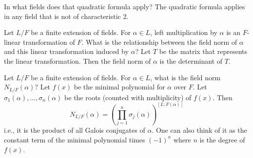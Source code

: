 \documentclass[avery5371,grid]{flashcards}
\begin{document}
% 
% 




 







\begin{flashcard}[Fields]{In what fields does that quadratic formula apply?}
 The quadratic formula applies in any field that is not of characteristic 2.
\end{flashcard}

\begin{flashcard}[Fields]{Let $L/F$ be a finite extension of fields. For $\alpha \in L$, left multiplication by $\alpha$ is an $F$-linear transformation of $F$. What is the relationship between the field norm of $\alpha$ and this linear transformation induced by $\alpha$?}
 Let $T$ be the matrix that represents the linear transformation. Then the field norm of $\alpha$ is the determinant of $T$.
\end{flashcard}

\begin{flashcard}[Fields]{Let $L/F$ be a finite extension of fields. For $\alpha \in L$, what is the field norm $N_{L/F}(\alpha)$?}
 Let $f(x)$ be the minimal polynomial for $\alpha$ over $F$. Let $\sigma_1(\alpha), \ldots, \sigma_n(\alpha)$ be the roots (counted with multiplicity) of $f(x)$. Then
 $$
 N_{L/F}(\alpha) = \left ( \prod_{j=1}^n \sigma_j(\alpha) \right) ^{[L:F(\alpha)]}
 $$
 i.e., it is the product of all Galois conjugates of $\alpha$. One can also think of it as the constant term of the minimal polynomial times $(-1)^n$ where $n$ is the degree of $f(x)$.
\end{flashcard}
\end{document}
